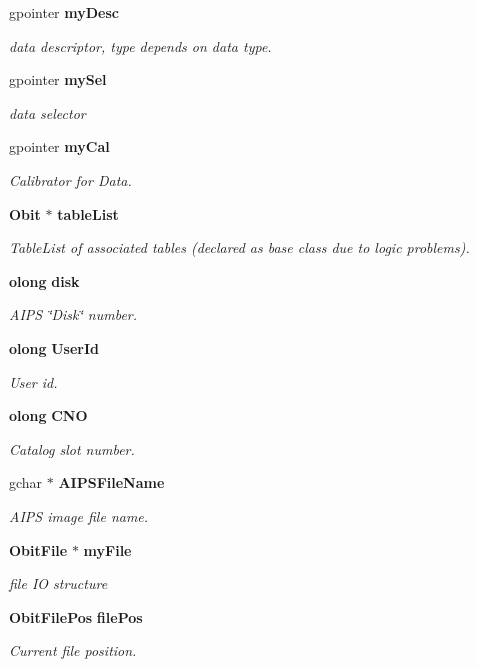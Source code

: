 \begin{CompactItemize}
gpointer {\bf my\-Desc}
\begin{CompactList}\small\item\em data descriptor, type depends on data type. \item\end{CompactList}\item 
gpointer {\bf my\-Sel}
\begin{CompactList}\small\item\em data selector \item\end{CompactList}\item 
gpointer {\bf my\-Cal}
\begin{CompactList}\small\item\em Calibrator for Data. \item\end{CompactList}\item 
{\bf Obit} $\ast$ {\bf table\-List}
\begin{CompactList}\small\item\em Table\-List of associated tables (declared as base class due to logic problems). \item\end{CompactList}\item 
{\bf olong} {\bf disk}
\begin{CompactList}\small\item\em AIPS \char`\"{}Disk\char`\"{} number. \item\end{CompactList}\item 
{\bf olong} {\bf User\-Id}
\begin{CompactList}\small\item\em User id. \item\end{CompactList}\item 
{\bf olong} {\bf CNO}
\begin{CompactList}\small\item\em Catalog slot number. \item\end{CompactList}\item 
gchar $\ast$ {\bf AIPSFile\-Name}
\begin{CompactList}\small\item\em AIPS image file name. \item\end{CompactList}\item 
{\bf Obit\-File} $\ast$ {\bf my\-File}
\begin{CompactList}\small\item\em file IO structure \item\end{CompactList}\item 
{\bf Obit\-File\-Pos} {\bf file\-Pos}
\begin{CompactList}\small\item\em Current file position. \item\end{CompactList}\end{CompactItemize}


